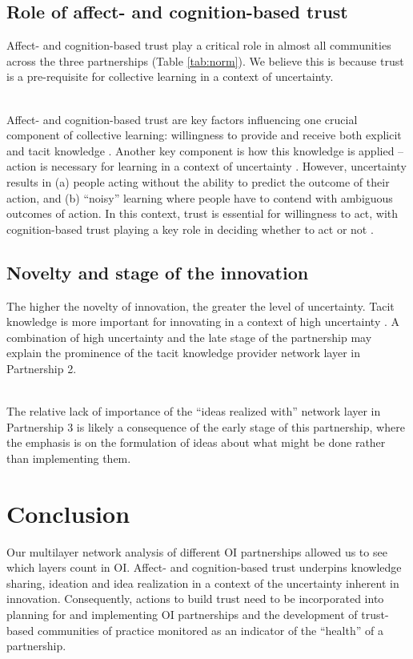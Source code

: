 \documentclass[final]{beamer}
\begin{document}
\begin{frame}[t]
\begin{multicols}{3}
\subsection{Role of affect- and cognition-based trust} 

Affect- and cognition-based trust play a critical role in almost all communities across the three partnerships (Table \ref{tab:norm}). We believe this is because trust is a pre-requisite for collective learning in a context of uncertainty. \\~\

Affect- and cognition-based trust are key factors influencing one crucial component of collective learning: willingness to provide and receive both explicit and tacit knowledge \cite{levin2004strength}. Another key component is how this knowledge is applied -- action is necessary for learning in a context of uncertainty \cite{van2008innovation}. However, uncertainty results in (a) people acting without the ability to predict the outcome of their action, and (b) \enquote{noisy} learning where people have to contend with ambiguous outcomes of action. In this context, trust is essential for willingness to act, with cognition-based trust playing a key role in deciding whether to act or not \cite{mcevily2011measuring}.  

\subsection{Novelty and stage of the innovation}

The higher the novelty of innovation, the greater the level of uncertainty. Tacit knowledge is more important for innovating in a context of high uncertainty \cite{van2008innovation}. A combination of high uncertainty and the late stage of the partnership may explain the prominence of the tacit knowledge provider network layer in Partnership 2. \\~\

The relative lack of importance of the \enquote{ideas realized with} network layer in Partnership 3 is likely a consequence of the early stage of this partnership, where the emphasis is on the formulation of ideas about what might be done rather than implementing them.

\section{Conclusion}

Our multilayer network analysis of different OI partnerships allowed us to see which layers count in OI. Affect- and cognition-based trust underpins knowledge sharing, ideation and idea realization in a context of the uncertainty inherent in innovation. Consequently, actions to build trust need to be incorporated into planning for and implementing OI partnerships and the development of trust-based communities of practice monitored as an indicator of the \enquote{health} of a partnership. 


\end{multicols}
\end{frame}
\end{document}
